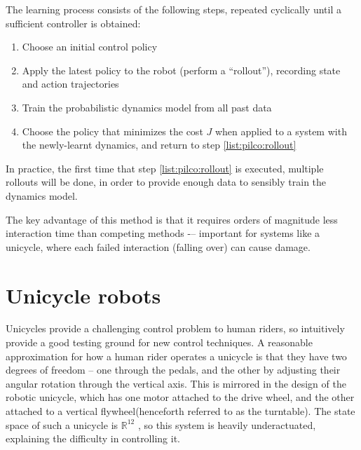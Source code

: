 \documentclass[main.tex]{subfiles}
\begin{document}
	The learning process consists of the following steps, repeated cyclically until a sufficient controller is obtained:
	\begin{enumerate}[nosep]
		\item Choose an initial control policy
		\item Apply the latest policy to the robot (perform a \enquote{rollout}), recording state and action trajectories \label{list:pilco:rollout}
		\item Train the probabilistic dynamics model from all past data
		\item Choose the policy that minimizes the cost $J$ when applied to a system with the newly-learnt dynamics, and return to step \ref{list:pilco:rollout}
	\end{enumerate}
	In practice, the first time that step \ref{list:pilco:rollout} is executed, multiple rollouts will be done, in order to provide enough data to sensibly train the dynamics model.

	The key advantage of this method is that it requires orders of magnitude less interaction time \cite{pilco} than competing methods -– important for systems like a unicycle, where each failed interaction (falling over) can cause damage.

\section{Unicycle robots}




	Unicycles provide a challenging control problem to human riders, so intuitively provide a good testing ground for new control techniques.
	A reasonable approximation for how a human rider operates a unicycle is that they have two degrees of freedom -- one through the pedals, and the other by adjusting their angular rotation through the vertical axis.
	This is mirrored in the design of the robotic unicycle, which has one motor attached to the drive wheel, and the other attached to a vertical flywheel\footnotemark (henceforth referred to as the turntable).
	The state space of such a unicycle is $\mathbb{R}^{12}$ \cite{forster}, so this system is heavily underactuated, explaining the difficulty in controlling it.

\end{document}

